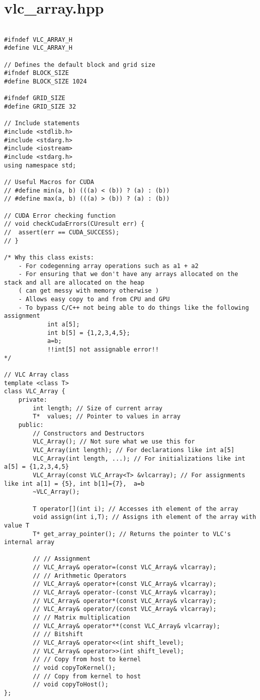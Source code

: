 \section{vlc_array.hpp}
\begin{verbatim}

#ifndef VLC_ARRAY_H
#define VLC_ARRAY_H

// Defines the default block and grid size
#ifndef BLOCK_SIZE
#define BLOCK_SIZE 1024

#ifndef GRID_SIZE
#define GRID_SIZE 32

// Include statements
#include <stdlib.h>
#include <stdarg.h>
#include <iostream>
#include <stdarg.h>
using namespace std;

// Useful Macros for CUDA
// #define min(a, b) (((a) < (b)) ? (a) : (b))
// #define max(a, b) (((a) > (b)) ? (a) : (b))

// CUDA Error checking function
// void checkCudaErrors(CUresult err) {
// 	assert(err == CUDA_SUCCESS);
// }

/* Why this class exists:
	- For codegenning array operations such as a1 + a2
	- For ensuring that we don't have any arrays allocated on the stack and all are allocated on the heap
	( can get messy with memory otherwise ) 
	- Allows easy copy to and from CPU and GPU
	- To bypass C/C++ not being able to do things like the following assignment
			int a[5];
			int b[5] = {1,2,3,4,5};
			a=b;
			!!int[5] not assignable error!!
*/

// VLC Array class
template <class T>
class VLC_Array {
	private:
		int length; // Size of current array
		T*  values; // Pointer to values in array
	public:
		// Constructors and Destructors
		VLC_Array(); // Not sure what we use this for
		VLC_Array(int length); // For declarations like int a[5]
		VLC_Array(int length, ...); // For initializations like int a[5] = {1,2,3,4,5}
		VLC_Array(const VLC_Array<T> &vlcarray); // For assignments like int a[1] = {5}, int b[1]={7},  a=b
		~VLC_Array();
		
		T operator[](int i); // Accesses ith element of the array
		void assign(int i,T); // Assigns ith element of the array with value T
		T* get_array_pointer(); // Returns the pointer to VLC's internal array

		// // Assignment
		// VLC_Array& operator=(const VLC_Array& vlcarray);
		// // Arithmetic Operators
		// VLC_Array& operator+(const VLC_Array& vlcarray);
		// VLC_Array& operator-(const VLC_Array& vlcarray);
		// VLC_Array& operator*(const VLC_Array& vlcarray);
		// VLC_Array& operator/(const VLC_Array& vlcarray);
		// // Matrix multiplication
		// VLC_Array& operator**(const VLC_Array& vlcarray);
		// // Bitshift
		// VLC_Array& operator<<(int shift_level);
		// VLC_Array& operator>>(int shift_level);
		// // Copy from host to kernel
		// void copyToKernel();
		// // Copy from kernel to host
		// void copyToHost();
};


\end{verbatim}
